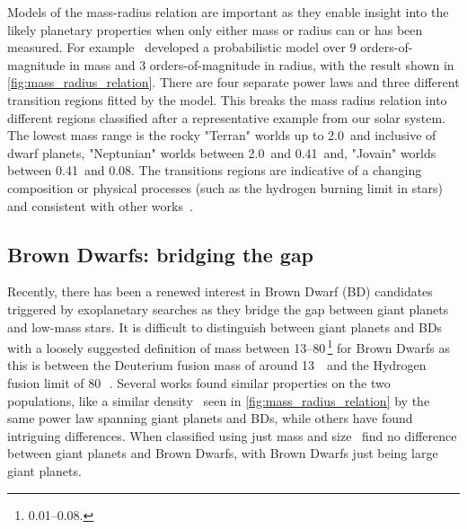Models of the mass-radius relation are important as they enable insight into the likely planetary properties when only either mass or radius can or has been measured.
For example~\citet{chen_probabilistic_2016} developed a probabilistic model over 9 orders-of-magnitude in mass and 3 orders-of-magnitude in radius, with the result shown in \cref{fig:mass_radius_relation}.
There are four separate power laws and three different transition regions fitted by the model.
This breaks the mass radius relation into different regions classified after a representative example from our solar system.
The lowest mass range is the rocky "Terran" worlds up to 2.0\,\Mearth{} and inclusive of dwarf planets, "Neptunian" worlds between 2.0\,\Mearth{} and 0.41\,\Mjup{} and, "Jovain" worlds between 0.41\,\Mjup{} and 0.08\Msun{}.
The transitions regions are indicative of a changing composition or physical processes (such as the hydrogen burning limit in stars) and consistent with other works~\citep[e.g.][]{weiss_mass_2013, dieterich_solar_2014, hatzes_definition_2015, rogers_most_2015}.

\subsection{Brown Dwarfs: bridging the gap}
Recently, there has been a renewed interest in Brown Dwarf (BD) candidates triggered by exoplanetary searches as they bridge the gap between giant planets and low-mass stars.
It is difficult to distinguish between giant planets and {BD}s with a loosely suggested definition of mass between 13--80\,\Mjup{}\footnote{0.01--0.08\Msun{}.} for Brown Dwarfs as this is between the Deuterium fusion mass of around 13\,\Mjup{}~\citep[e.g.][]{spiegel_deuteriumburning_2011} and the Hydrogen fusion limit of 80\,\Mjup{}~\citep{chabrier_theory_2000, dieterich_solar_2014}.
Several works found similar properties on the two populations, like a similar density~\citep{hatzes_definition_2015, chen_probabilistic_2016} seen in \cref{fig:mass_radius_relation} by the same power law spanning giant planets and {BD}s, while others have found intriguing differences.
When classified using just mass and size~\citet{chen_probabilistic_2016} find no difference between giant planets and Brown Dwarfs, with Brown Dwarfs just being large giant planets.

